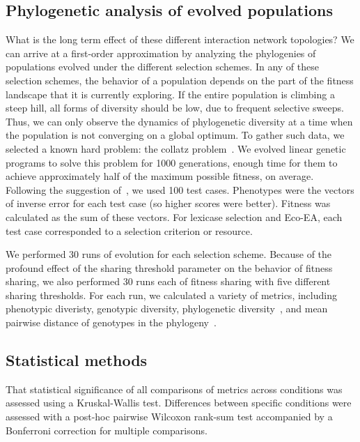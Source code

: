 \subsection{Phylogenetic analysis of evolved populations}
What is the long term effect of these different interaction network topologies? We can arrive at a first-order approximation by analyzing the phylogenies of populations evolved under the different selection schemes. In any of these selection schemes, the behavior of a population depends on the part of the fitness landscape that it is currently exploring. If the entire population is climbing a steep hill, all forms of diversity should be low, due to frequent selective sweeps. Thus, we can only observe the dynamics of phylogenetic diversity at a time when the population is not converging on a global optimum. To gather such data, we selected a known hard problem: the collatz problem~\cite{helmuth_general_2015}. We evolved linear genetic programs to solve this problem for 1000 generations, enough time for them to achieve approximately half of the maximum possible fitness, on average. Following the suggestion of~\cite{helmuth_general_2015}, we used 100 test cases. Phenotypes were the vectors of inverse error for each test case (so higher scores were better). Fitness was calculated as the sum of these vectors. For lexicase selection and Eco-EA, each test case corresponded to a selection criterion or resource. 

We performed 30 runs of evolution for each selection scheme. Because of the profound effect of the sharing threshold parameter on the behavior of fitness sharing, we also performed 30 runs each of fitness sharing with five different sharing thresholds. For each run, we calculated a variety of metrics, including phenotypic diveristy, genotypic diversity, phylogenetic diversity~\cite{faith_conservation_1992}, and mean pairwise distance of genotypes in the phylogeny~\cite{webb_exploring_2000}. 

\subsection{Statistical methods}
That statistical significance of all comparisons of metrics across conditions was assessed using a Kruskal-Wallis test. Differences between specific conditions were assessed with a post-hoc pairwise Wilcoxon rank-sum test accompanied by a Bonferroni correction for multiple comparisons.

